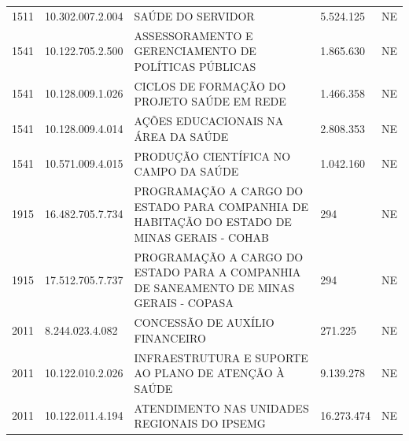 \documentclass{article}
\begin{document}
\begin{longtable}[c]{m{1cm}|m{2cm}|m{10cm}|m{2cm}|m{1cm}}
\multicolumn{1}{C{1cm}|}{1511} & \multicolumn{1}{C{2cm}|}{10.302.007.2.004} & \multicolumn{1}{L{10cm}|}{SAÚDE DO SERVIDOR} & \multicolumn{1}{R{2cm}|}{5.524.125} & \multicolumn{1}{C{1cm}}{NE} \\
\multicolumn{1}{C{1cm}|}{1541} & \multicolumn{1}{C{2cm}|}{10.122.705.2.500} & \multicolumn{1}{L{10cm}|}{ASSESSORAMENTO E GERENCIAMENTO DE POLÍTICAS PÚBLICAS} & \multicolumn{1}{R{2cm}|}{1.865.630} & \multicolumn{1}{C{1cm}}{NE} \\
\multicolumn{1}{C{1cm}|}{1541} & \multicolumn{1}{C{2cm}|}{10.128.009.1.026} & \multicolumn{1}{L{10cm}|}{CICLOS DE FORMAÇÃO DO PROJETO SAÚDE EM REDE} & \multicolumn{1}{R{2cm}|}{1.466.358} & \multicolumn{1}{C{1cm}}{NE} \\
\multicolumn{1}{C{1cm}|}{1541} & \multicolumn{1}{C{2cm}|}{10.128.009.4.014} & \multicolumn{1}{L{10cm}|}{AÇÕES EDUCACIONAIS NA ÁREA DA SAÚDE} & \multicolumn{1}{R{2cm}|}{2.808.353} & \multicolumn{1}{C{1cm}}{NE} \\
\multicolumn{1}{C{1cm}|}{1541} & \multicolumn{1}{C{2cm}|}{10.571.009.4.015} & \multicolumn{1}{L{10cm}|}{PRODUÇÃO CIENTÍFICA NO CAMPO DA SAÚDE} & \multicolumn{1}{R{2cm}|}{1.042.160} & \multicolumn{1}{C{1cm}}{NE} \\
\multicolumn{1}{C{1cm}|}{1915} & \multicolumn{1}{C{2cm}|}{16.482.705.7.734} & \multicolumn{1}{L{10cm}|}{PROGRAMAÇÃO A CARGO DO ESTADO PARA COMPANHIA DE HABITAÇÃO DO ESTADO DE MINAS GERAIS - COHAB} & \multicolumn{1}{R{2cm}|}{294} & \multicolumn{1}{C{1cm}}{NE} \\
\multicolumn{1}{C{1cm}|}{1915} & \multicolumn{1}{C{2cm}|}{17.512.705.7.737} & \multicolumn{1}{L{10cm}|}{PROGRAMAÇÃO A CARGO DO ESTADO PARA A COMPANHIA DE SANEAMENTO DE MINAS GERAIS - COPASA} & \multicolumn{1}{R{2cm}|}{294} & \multicolumn{1}{C{1cm}}{NE} \\
\multicolumn{1}{C{1cm}|}{2011} & \multicolumn{1}{C{2cm}|}{8.244.023.4.082} & \multicolumn{1}{L{10cm}|}{CONCESSÃO DE AUXÍLIO FINANCEIRO} & \multicolumn{1}{R{2cm}|}{271.225} & \multicolumn{1}{C{1cm}}{NE} \\
\multicolumn{1}{C{1cm}|}{2011} & \multicolumn{1}{C{2cm}|}{10.122.010.2.026} & \multicolumn{1}{L{10cm}|}{INFRAESTRUTURA E SUPORTE AO PLANO DE ATENÇÃO À SAÚDE} & \multicolumn{1}{R{2cm}|}{9.139.278} & \multicolumn{1}{C{1cm}}{NE} \\
\multicolumn{1}{C{1cm}|}{2011} & \multicolumn{1}{C{2cm}|}{10.122.011.4.194} & \multicolumn{1}{L{10cm}|}{ATENDIMENTO NAS UNIDADES REGIONAIS DO IPSEMG} & \multicolumn{1}{R{2cm}|}{16.273.474} & \multicolumn{1}{C{1cm}}{NE} \\

\end{longtable}
\end{document}
